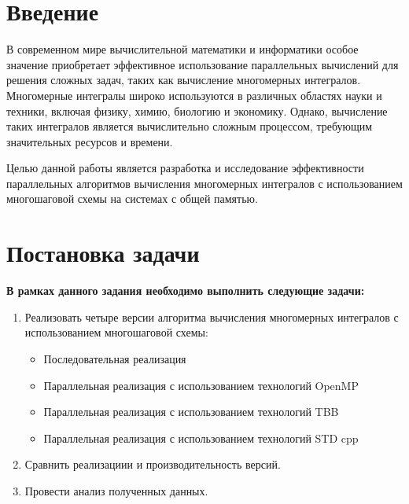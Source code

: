 \documentclass{report}
\begin{document}
\setcounter{page}{2}

\tableofcontents
\newpage

\section*{Введение}
\par В современном мире вычислительной математики и информатики особое значение приобретает эффективное использование параллельных вычислений для решения сложных задач, таких как вычисление многомерных интегралов. Многомерные интегралы широко используются в различных областях науки и техники, включая физику, химию, биологию и экономику. Однако, вычисление таких интегралов является вычислительно сложным процессом, требующим значительных ресурсов и времени.

\par Целью данной работы является разработка и исследование эффективности параллельных алгоритмов вычисления многомерных интегралов с использованием многошаговой схемы на системах с общей памятью.

\newpage

\section*{Постановка задачи}
\par \textbf{В рамках данного задания необходимо выполнить следующие задачи:}
\begin{enumerate}
    \item Реализовать четыре версии алгоритма вычисления многомерных интегралов с использованием многошаговой схемы:
    \begin{itemize}
    \item Последовательная реализация
    \item Параллельная реализация с использованием технологий OpenMP
    \item Параллельная реализация с использованием технологий TBB
    \item Параллельная реализация с использованием технологий STD cpp
    \end{itemize}
    \item Сравнить реализациии и производительность версий.
    \item Провести анализ полученных данных.
\end{enumerate}
\newpage
\end{document}

